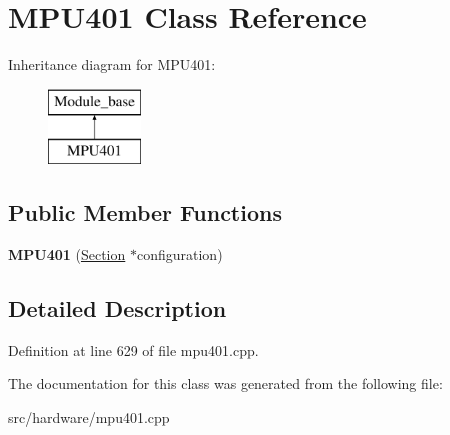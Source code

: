 \hypertarget{classMPU401}{\section{M\-P\-U401 Class Reference}
\label{classMPU401}
}
Inheritance diagram for M\-P\-U401\-:\begin{figure}[H]
\begin{center}
\leavevmode
\includegraphics[height=2.000000cm]{classMPU401}
\end{center}
\end{figure}
\subsection*{Public Member Functions}
\begin{DoxyCompactItemize}
\item 
\hypertarget{classMPU401_a7df40b93d9eb674d176f26e368af32f2}{{\bfseries M\-P\-U401} (\hyperlink{classSection}{Section} $\ast$configuration)}\label{classMPU401_a7df40b93d9eb674d176f26e368af32f2}

\end{DoxyCompactItemize}


\subsection{Detailed Description}


Definition at line 629 of file mpu401.\-cpp.



The documentation for this class was generated from the following file\-:\begin{DoxyCompactItemize}
\item 
src/hardware/mpu401.\-cpp\end{DoxyCompactItemize}
